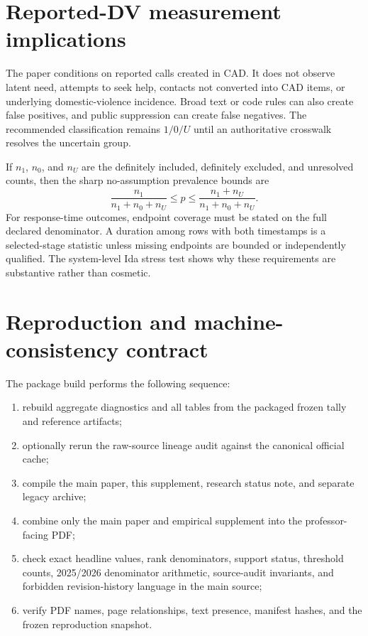 \documentclass[11pt]{article}
\begin{document}
\section{Reported-DV measurement implications}

The paper conditions on reported calls created in CAD. It does not observe latent need, attempts to seek help, contacts not converted into CAD items, or underlying domestic-violence incidence. Broad text or code rules can also create false positives, and public suppression can create false negatives. The recommended classification remains $1/0/U$ until an authoritative crosswalk resolves the uncertain group.

If $n_1$, $n_0$, and $n_U$ are the definitely included, definitely excluded, and unresolved counts, then the sharp no-assumption prevalence bounds are
\begin{equation}
\frac{n_1}{n_1+n_0+n_U}
\le p\le
\frac{n_1+n_U}{n_1+n_0+n_U}.
\end{equation}
For response-time outcomes, endpoint coverage must be stated on the full declared denominator. A duration among rows with both timestamps is a selected-stage statistic unless missing endpoints are bounded or independently qualified. The system-level Ida stress test shows why these requirements are substantive rather than cosmetic.

\section{Reproduction and machine-consistency contract}

The package build performs the following sequence:
\begin{enumerate}
\item rebuild aggregate diagnostics and all tables from the packaged frozen tally and reference artifacts;
\item optionally rerun the raw-source lineage audit against the canonical official cache;
\item compile the main paper, this supplement, research status note, and separate legacy archive;
\item combine only the main paper and empirical supplement into the professor-facing PDF;
\item check exact headline values, rank denominators, support status, threshold counts, 2025/2026 denominator arithmetic, source-audit invariants, and forbidden revision-history language in the main source;
\item verify PDF names, page relationships, text presence, manifest hashes, and the frozen reproduction snapshot.
\end{enumerate}
\end{document}
